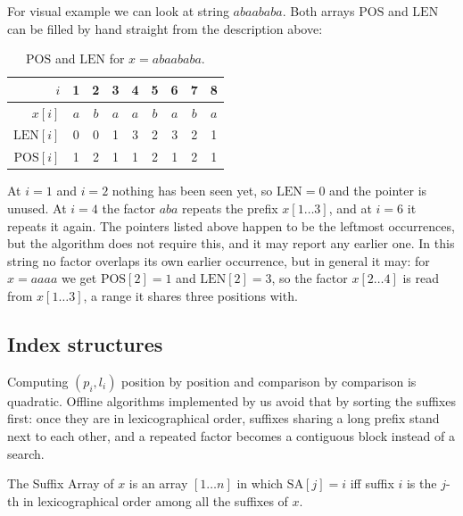 \noindent For visual example we can look at string \(abaababa\). Both arrays \(\mathrm{POS}\) and \(\mathrm{LEN}\) can be filled by hand straight from the description above:
\begin{table}[H]
    \centering
    \begin{tabular}{r|cccccccc}
        \toprule
        \(i\)               & 1 & 2 & 3 & 4 & 5 & 6 & 7 & 8 \\
        \midrule
        \(x[i]\)            & \(a\) & \(b\) & \(a\) & \(a\) & \(b\) & \(a\) & \(b\) & \(a\) \\
        \(\mathrm{LEN}[i]\) & 0 & 0 & 1 & 3 & 2 & 3 & 2 & 1 \\
        \(\mathrm{POS}[i]\) & 1 & 2 & 1 & 1 & 2 & 1 & 2 & 1 \\
        \bottomrule
    \end{tabular}
    \caption{\(\mathrm{POS}\) and \(\mathrm{LEN}\) for \(x = abaababa\).}
    \label{tab:pos-len-example}
\end{table}
\noindent At \(i = 1\) and \(i = 2\) nothing has been seen yet, so \(\mathrm{LEN} = 0\) and the pointer is unused. At \(i = 4\) the factor \(aba\) repeats the prefix \(x[1 \ldots 3]\), and at \(i = 6\) it repeats it again. The pointers listed above happen to be the leftmost occurrences, but the algorithm does not require this, and it may report any earlier one. In this string no factor overlaps its own earlier occurrence, but in general it may: for \(x = aaaa\) we get \(\mathrm{POS}[2] = 1\) and \(\mathrm{LEN}[2] = 3\), so the factor \(x[2 \ldots 4]\) is read from \(x[1 \ldots 3]\), a range it shares three positions with.


\subsection{Index structures}

Computing \((p_i, l_i)\) position by position and comparison by comparison is quadratic. Offline algorithms implemented by us avoid that by sorting the suffixes first: once they are in lexicographical order, suffixes sharing a long prefix stand next to each other, and a repeated factor becomes a contiguous block instead of a search.
\begin{definition}
\label{def:suffix-array}
    The Suffix Array of \(x\) is an array \([1 \ldots n]\) in which \(\mathrm{SA}[j] = i\) iff
    suffix \(i\) is the \(j\)-th in lexicographical order among all the suffixes of \(x\).
\end{definition}


